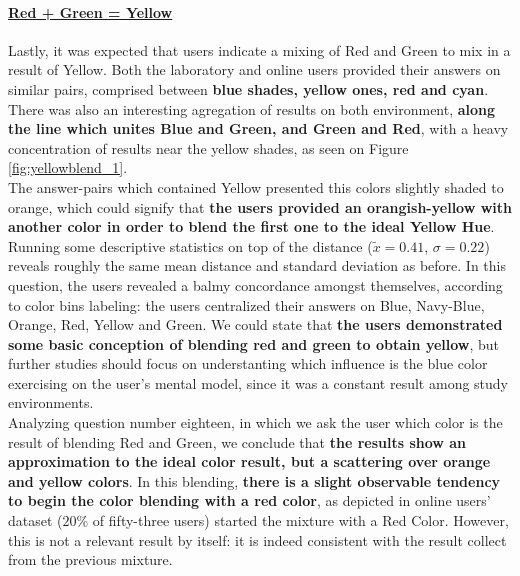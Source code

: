 \paragraph{\ul{Red + Green = Yellow}}
%
Lastly, it was expected that users indicate a mixing of Red and Green to mix in a result of Yellow. Both the laboratory and online users provided their answers on similar pairs, comprised between \textbf{blue shades, yellow ones, red and cyan}. There was also an
interesting agregation of results on both environment, \textbf{along the line which unites Blue and Green, and Green and Red}, with a heavy concentration of results near the yellow shades, as seen on Figure \ref{fig:yellowblend_1}. \\
%
The answer-pairs which contained Yellow presented this colors slightly shaded to orange, which could signify that \textbf{the users provided an orangish-yellow with another color in order to blend the first one to the ideal Yellow Hue}. \\
%
Running some descriptive statistics on top of the distance ($\tilde{x} = 0.41$, $\sigma = 0.22$) reveals roughly the same mean distance and standard deviation as before. In this question, the users revealed a balmy concordance amongst themselves, according to color bins
labeling: the users centralized their answers on Blue, Navy-Blue, Orange, Red, Yellow and Green. We could state that \textbf{the users demonstrated some basic conception of blending red and green to obtain yellow}, but further studies should focus on understanting which
influence is the blue color exercising on the user's mental model, since it was a constant result among study environments. \\
%
Analyzing question number eighteen, in which we ask the user which color is the result of blending Red and Green, we conclude that \textbf{the results show an approximation to the ideal color result, but a scattering over orange and yellow colors}.
In this blending, \textbf{there is a slight observable tendency to begin the color blending with a red color}, as depicted in online users' dataset ($20\%$ of fifty-three users) started the mixture with a Red Color. However, this is not a relevant result by itself: it is
indeed consistent with the result collect from the previous mixture. \\
%
